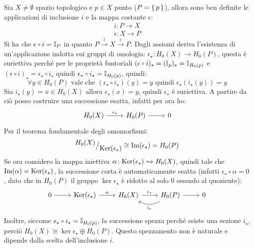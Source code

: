 Sia $ X \not = \emptyset $ spazio topologico e $ p \in X $ punto
($ P = \set{p} $), allora sono ben definite le applicazioni di inclusione $ i $
e la mappa costante $ \epsilon $:
\begin{gather*}
  i \colon P \to X \\
  \epsilon \colon X \to P
\end{gather*}
Si ha che $ \epsilon \circ i = \Id{P} $ in quanto
$ P \overset{i}{\to} X \overset{\epsilon}{\to} P $. Dagli assiomi deriva l'esistenza di
un'applicazione indotta sui gruppi di omologia:
$ \epsilon_\star \colon H_0(X) \to H_0(P) $, questa è suriettiva perché per le proprietà
funtoriali $ (\epsilon \circ i)_\star = (\Id{p})_\star = \Id{H_0(p)} $ e
$ (\epsilon \circ i)_\star = \epsilon_\star \circ i_\star $ quindi $ \epsilon_\star \circ i_\star = \Id{H_0(p)} $, quindi:
\[
  \forall y \in H_0(P) \text{ vale che } (\epsilon_\star \circ i_\star)(y) = y \text{ quindi } \epsilon_\star (i_\star(y)) = y
\]
Sia $ i_\star(y) = x \in H_0(X) $ allora $ \epsilon_\star(x) = y $, quindi $ \epsilon_\star $ è suriettiva.
A partire da ciò posso costruire una successione esatta, infatti per ora ho:
\[
  \begin{tikzcd}
    H_0(X) \rar{\epsilon_\star} & H_0(P) \rar & 0
  \end{tikzcd}
\]
Per il teorema fondamentale degli omomorfismi:
\[
  {^{\textstyle H_0(X)}\big/_{\textstyle \mathrm{Ker}( \epsilon_\star)}} \cong \mathrm{Im}( \epsilon_\star ) = H_0(P)
\]
Se ora considero la mappa iniettiva
$ \alpha \colon \mathrm{Ker}( \epsilon_\star) \xhookrightarrow{} H_0(X) $, quindi tale che
$ \mathrm{Im}( \alpha ) = \mathrm{Ker}( \epsilon_\star) $, la successione corta è automaticamente esatta (infatti
$ \epsilon_\star \circ \alpha = 0 $, dato che in $ H_0(P) $ il gruppo
$ \ker{\epsilon_\star} $ è ridotto al solo $ 0 $ essendo al quoziente):
\[
  \begin{tikzcd}
    0 \arrow{r}{} & \ker{\epsilon_\star} \arrow{r}{\alpha} & H_0(X) \arrow{r}{\epsilon_\star} & \arrow[bend left]{l}{i_\star} H_0(P) \arrow{r}{} & 0
  \end{tikzcd}
\]
Inoltre, siccome $ \epsilon_\star \circ i_\star = \Id{H_0(p)} $, la successione spezza perché
esiste una sezione $ i_\star $, perciò
$ H_0(X) \cong \ker{\epsilon_\star} \oplus H_0(P) $. Questo spezzamento non è naturale e dipende
dalla scelta dell'inclusione $ i $.

